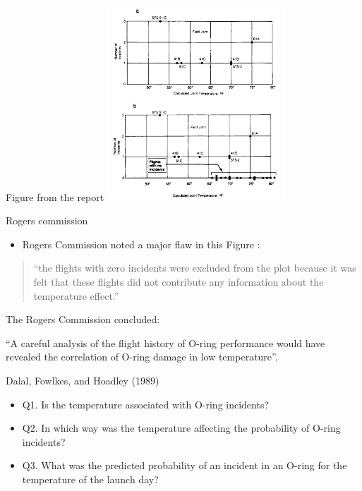 \documentclass[
  ignorenonframetext,
]{beamer}
\providecommand{\tightlist}{%
  \setlength{\itemsep}{0pt}\setlength{\parskip}{0pt}}
\begin{document}
\begin{frame}{Figure from the report}
\protect\hypertarget{figure-from-the-report}{}
\includegraphics[width=0.5\textwidth,height=\textheight]{challenger.png}
\end{frame}

\begin{frame}{Rogers commission}
\protect\hypertarget{rogers-commission}{}
\begin{itemize}
\tightlist
\item
  Rogers Commission noted a major flaw in this Figure :
\end{itemize}

\begin{quote}
``the flights with zero incidents were excluded from the plot because it
was felt that these flights did not contribute any information about the
temperature effect.''
\end{quote}

The Rogers Commission concluded:

``A careful analysis of the flight history of O-ring performance would
have revealed the correlation of O-ring damage in low temperature''.
\end{frame}

\begin{frame}{Dalal, Fowlkes, and Hoadley (1989)}
\protect\hypertarget{dalal-fowlkes-and-hoadley-1989}{}
\begin{itemize}
\tightlist
\item
  Q1. Is the temperature associated with O-ring incidents?
\item
  Q2. In which way was the temperature affecting the probability of
  O-ring incidents?
\item
  Q3. What was the predicted probability of an incident in an O-ring for
  the temperature of the launch day?
\end{itemize}
\end{frame}
\end{document}
